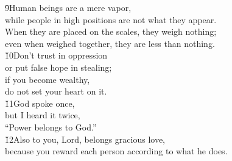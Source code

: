 \begin{poetry}
\poeml \v{9}Human beings are a mere vapor, \\
\poemll    while people in high positions are not what they appear. \\
\poemll    When they are placed on the scales, they weigh nothing; \\
\poemlll       even when weighed together, they are less than nothing. \\
\poeml \v{10}Don't trust in oppression \\
\poemll    or put false hope in stealing; \\
\poeml if you become wealthy, \\
\poemll    do not set your heart on it. \\
\poeml \v{11}God spoke once, \\
\poemll    but I heard it twice, \\
\poemlll       ``Power belongs to God.'' \\
\poeml \v{12}Also to you, Lord, belongs gracious love, \\
\poemll    because you reward each person according to what he does.
\end{poetry}

